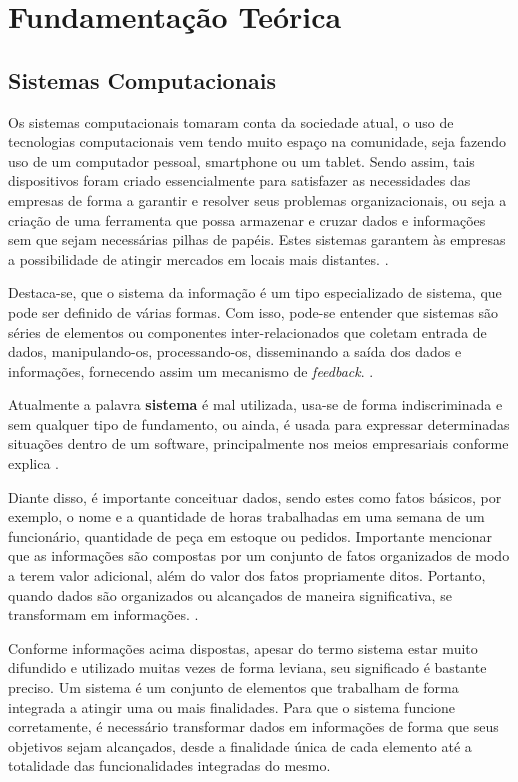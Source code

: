 \chapter{Fundamentação Teórica}

\section{Sistemas Computacionais}

Os sistemas computacionais tomaram conta da sociedade atual, o uso de tecnologias computacionais vem tendo muito espaço na comunidade, seja fazendo uso de um computador pessoal, smartphone ou um tablet. Sendo assim, tais dispositivos foram criado essencialmente para satisfazer as necessidades das empresas de forma a garantir e resolver seus problemas organizacionais, ou seja a criação de uma ferramenta que possa armazenar e cruzar dados e informações sem que sejam necessárias pilhas de papéis. Estes sistemas garantem às empresas a possibilidade de atingir mercados em locais mais distantes. \cite{MATTIOLI2020}.

Destaca-se, que o sistema da informação é um tipo especializado de sistema, que pode ser definido de várias formas. Com isso, pode-se entender que sistemas são séries de elementos ou componentes inter-relacionados que coletam entrada de dados, manipulando-os, processando-os, disseminando a saída dos dados e informações, fornecendo assim um mecanismo de \textit{feedback}. \cite{STAIR2008}.

Atualmente a palavra \textbf{sistema} é mal utilizada, usa-se de forma indiscriminada e sem qualquer tipo de fundamento, ou ainda, é usada para expressar determinadas situações dentro de um software, principalmente nos meios empresariais conforme explica \cite{ROSSINI2006}.

Diante disso, é importante conceituar dados, sendo estes como fatos básicos, por exemplo, o nome e a quantidade de horas trabalhadas em uma semana de um funcionário, quantidade de peça em estoque ou pedidos. Importante mencionar que as informações são compostas por um conjunto de fatos organizados de modo a terem valor adicional, além do valor dos fatos propriamente ditos. Portanto, quando dados são organizados ou alcançados de maneira significativa, se transformam em informações. \cite{STAIR2008}.

Conforme informações acima dispostas, apesar do termo sistema estar muito difundido e utilizado muitas vezes de forma leviana, seu significado é bastante preciso. Um sistema é um conjunto de elementos que trabalham de forma integrada a atingir uma ou mais finalidades.
Para que o sistema funcione corretamente, é necessário transformar dados em informações de forma que seus objetivos sejam alcançados, desde a finalidade única de cada elemento até a totalidade das funcionalidades integradas do mesmo.

